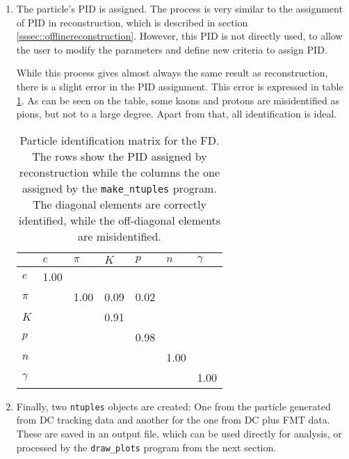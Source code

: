 \begin{enumerate}
        \item
            The particle's PID is assigned.
            The process is very similar to the assignment of PID in reconstruction, which is described in section \ref{sssec::offlinereconstruction}.
            However, this PID is not directly used, to allow the user to modify the parameters and define new criteria to assign PID.

            While this process gives almost always the same result as reconstruction, there is a slight error in the PID assignment.
            This error is expressed in table \ref{tab::mpid}.
            As can be seen on the table, some kaons and protons are misidentified as pions, but not to a large degree.
            Apart from that, all identification is ideal.
            
            \begin{table}
                \caption{Particle identification matrix for the FD.
                The rows show the PID assigned by reconstruction while the columns the one assigned by the \texttt{make\_ntuples} program.
                The diagonal elements are correctly identified, while the off-diagonal elements are misidentified.}

                \begin{center}
                    \begin{tabularx}{240pt}{X|llllll}
                        \cline{2-7}
                                 & $e$      & $\pi$ & $K$  & $p$  & $n$  & $\gamma$ \\
                        \hline
                        $e$      & 1.00     &       &      &      &      &          \\
                        $\pi$    &          & 1.00  & 0.09 & 0.02 &      &          \\
                        $K$      &          &       & 0.91 &      &      &          \\
                        $p$      &          &       &      & 0.98 &      &          \\
                        $n$      &          &       &      &      & 1.00 &          \\
                        $\gamma$ &          &       &      &      &      & 1.00     \\
                        \hline
                    \end{tabularx}
                \end{center}
                \label{tab::mpid}
            \end{table}

        \item
            Finally, two \texttt{ntuples} objects are created: One from the particle generated from DC tracking data and another for the one from DC plus FMT data.
            These are saved in an output file, which can be used directly for analysis, or processed by the \texttt{draw\_plots} program from the next section.
    \end{enumerate}


